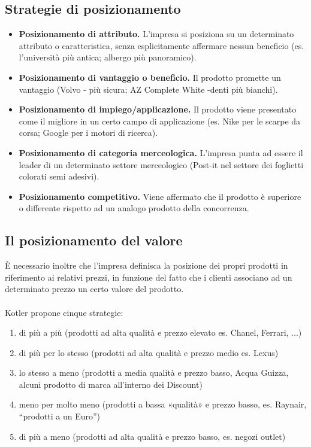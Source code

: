 \subsection{Strategie di posizionamento}
\begin{itemize}
	\item \textbf{Posizionamento di attributo.} L’impresa si posiziona su un determinato attributo o caratteristica, senza esplicitamente affermare nessun beneficio (es. l’università più antica; albergo
	più panoramico).
	\item \textbf{Posizionamento di vantaggio o beneficio.} Il prodotto promette un vantaggio (Volvo - più sicura; AZ Complete White -denti più bianchi).
	\item \textbf{Posizionamento di impiego/applicazione.} Il prodotto viene presentato come il migliore in un certo campo di applicazione (es. Nike per le scarpe da corsa; Google per i motori di ricerca).
	\item \textbf{Posizionamento di categoria merceologica.} L’impresa punta ad essere il leader di un determinato settore merceologico (Post-it nel settore dei foglietti colorati semi adesivi).
	\item \textbf{Posizionamento competitivo.} Viene affermato che il prodotto è superiore o differente rispetto ad un analogo prodotto della concorrenza.
\end{itemize}

\subsection{Il posizionamento del valore}
È necessario inoltre che l’impresa definisca la posizione dei propri prodotti in riferimento ai relativi prezzi, in funzione del fatto che i clienti associano ad un determinato prezzo un certo valore del prodotto.
\\
\\
Kotler propone cinque strategie:
\begin{enumerate}
	\item di più a più (prodotti ad alta qualità e prezzo elevato es. Chanel, Ferrari, ...)
	\item di più per lo stesso (prodotti ad alta qualità e prezzo medio es. Lexus)
	\item lo stesso a meno (prodotti a media qualità e prezzo basso, Acqua Guizza, alcuni prodotto di marca all’interno dei Discount)
	\item meno per molto meno (prodotti a bassa «qualità» e prezzo basso, es. Raynair, “prodotti a un Euro”)
	\item di più a meno (prodotti ad alta qualità e prezzo
	basso, es. negozi outlet)
\end{enumerate}

